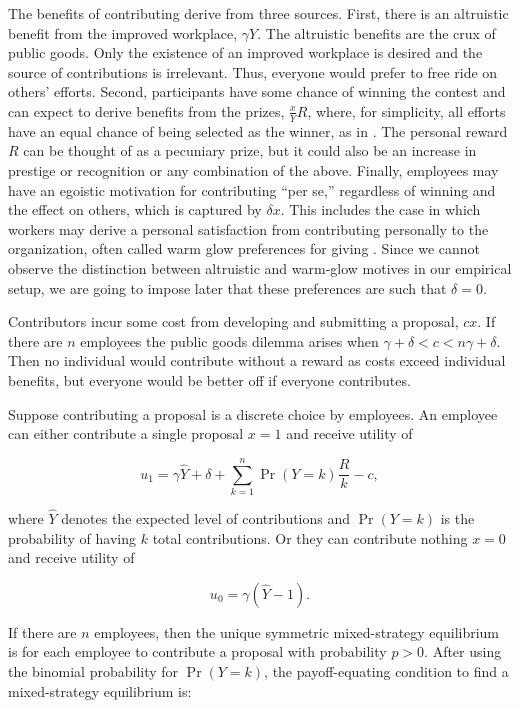 \documentclass[11pt, titlepage]{article}
\begin{document}
The benefits of contributing derive from three sources. First, there is
an altruistic benefit from the improved workplace, \(\gamma Y\). The
altruistic benefits are the crux of public goods. Only the existence of
an improved workplace is desired and the source of contributions is
irrelevant. Thus, everyone would prefer to free ride on others' efforts.
Second, participants have some chance of winning the contest and can
expect to derive benefits from the prizes, \(\frac{x}{Y} R\), where, for
simplicity, all efforts have an equal chance of being selected as the
winner, as in \citet{morgan2000financing}. The personal reward \(R\) can
be thought of as a pecuniary prize, but it could also be an increase in
prestige or recognition or any combination of the above. Finally,
employees may have an egoistic motivation for contributing ``per se,''
regardless of winning and the effect on others, which is captured by
\(\delta x\). This includes the case in which workers may derive a
personal satisfaction from contributing personally to the organization,
often called warm glow preferences for giving \citep{andreoni1995warm}.
Since we cannot observe the distinction between altruistic and warm-glow
motives in our empirical setup, we are going to impose later that these
preferences are such that \(\delta=0\).

Contributors incur some cost from developing and submitting a proposal,
\(c x\). If there are \(n\) employees the public goods dilemma arises
when \(\gamma+\delta < c < n\gamma+\delta\). Then no individual would
contribute without a reward as costs exceed individual benefits, but
everyone would be better off if everyone contributes.

Suppose contributing a proposal is a discrete choice by employees. An
employee can either contribute a single proposal \(x=1\) and receive
utility of

\begin{equation}
    u_1 = \gamma \hat Y + \delta + \sum_{k=1}^{n}\Pr(Y=k)\frac{R}{k}  - c, 
\end{equation}

where \(\hat Y\) denotes the expected level of contributions and
\(\Pr(Y=k)\) is the probability of having \(k\) total contributions. Or
they can contribute nothing \(x=0\) and receive utility of

\begin{equation}
  u_0 = \gamma (\hat Y - 1).
\end{equation}

If there are \(n\) employees, then the unique symmetric mixed-strategy
equilibrium is for each employee to contribute a proposal with
probability \(p>0\). After using the binomial probability for
\(\Pr(Y=k)\), the payoff-equating condition to find a mixed-strategy
equilibrium is:
\end{document}
